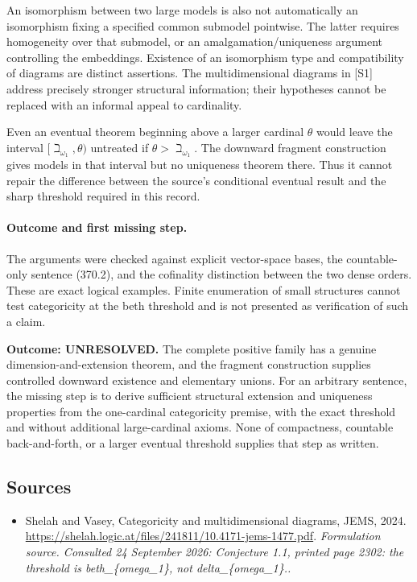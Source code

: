 \documentclass[11pt]{article}
\begin{document}
An isomorphism between two large models is also not automatically an
isomorphism fixing a specified common submodel pointwise. The latter
requires homogeneity over that submodel, or an amalgamation/uniqueness
argument controlling the embeddings. Existence of an isomorphism type
and compatibility of diagrams are distinct assertions. The multidimensional
diagrams in [S1] address precisely stronger structural information; their
hypotheses cannot be replaced with an informal appeal to cardinality.

Even an eventual theorem beginning above a larger cardinal $\theta$
would leave the interval $[\beth_{\omega_1},\theta)$ untreated if
$\theta>\beth_{\omega_1}$. The downward fragment construction gives
models in that interval but no uniqueness theorem there. Thus it cannot
repair the difference between the source's conditional eventual result
and the sharp threshold required in this record.

\paragraph{Outcome and first missing step.}
The arguments were checked against explicit vector-space bases, the
countable-only sentence (370.2), and the cofinality distinction between
the two dense orders. These are exact logical examples. Finite enumeration
of small structures cannot test categoricity at the beth threshold and
is not presented as verification of such a claim.

\textbf{Outcome: UNRESOLVED.} The complete positive family has a genuine
dimension-and-extension theorem, and the fragment construction supplies
controlled downward existence and elementary unions. For an arbitrary
sentence, the missing step is to derive sufficient structural extension
and uniqueness properties from the one-cardinal categoricity premise,
with the exact threshold and without additional large-cardinal axioms.
None of compactness, countable back-and-forth, or a larger eventual
threshold supplies that step as written.

\subsection{Sources}
\begin{itemize}
\item[S1]Shelah and Vasey, Categoricity and multidimensional diagrams, JEMS, 2024.
\url{https://shelah.logic.at/files/241811/10.4171-jems-1477.pdf}.
\textit{Formulation source. Consulted 24 September 2026: Conjecture 1.1, printed page 2302: the threshold is beth\_\{omega\_1\}, not delta\_\{omega\_1\}..}
\end{itemize}
\end{document}
